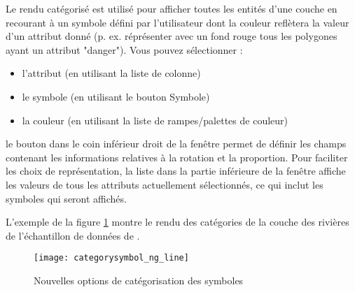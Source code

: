 
Le rendu catégorisé est utilisé pour afficher toutes les entités d'une couche en recourant à un symbole défini par l'utilisateur dont la couleur reflètera la valeur d'un attribut donné (p. ex. réprésenter avec un fond rouge tous les polygones ayant un attribut "danger"). Vous pouvez sélectionner :

\begin{itemize}[label=--]
\item l'attribut (en utilisant la liste de colonne)
\item le symbole (en utilisant le bouton Symbole)
\item la couleur (en utilisant la liste de rampes/palettes de couleur)
\end{itemize}

le bouton  dans le coin inférieur droit de la fenêtre permet de définir les champs contenant les informations relatives à la rotation et la proportion.
Pour faciliter les choix de représentation, la liste dans la partie inférieure de la fenêtre affiche les valeurs de tous les attributs actuellement sélectionnés, ce qui inclut les symboles qui seront affichés.

L'exemple de la figure \ref{fig:catsymNG} montre le rendu des catégories de la couche des rivières de l'échantillon de données de \qg.

\begin{figure}[ht]
   \centering
   \caption{Nouvelles options de catégorisation des symboles \nixcaption}\label{fig:catsymNG}
   \texttt{[image: categorysymbol\_ng\_line]}
\end{figure}

